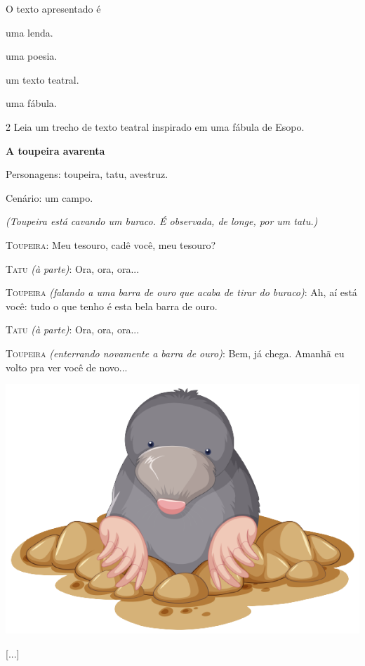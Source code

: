 O texto apresentado é

\begin{escolha}[itemsep=-5pt]
\item uma lenda.

\item uma poesia.

\item um texto teatral.

\item uma fábula.
\end{escolha}


\num{2} Leia um trecho de texto teatral inspirado em uma fábula de Esopo.

\begin{myquote}
\textbf{A toupeira avarenta}

Personagens: toupeira, tatu, avestruz.

Cenário: um campo.

\textit{(Toupeira está cavando um buraco. É observada, de longe, por um tatu.)}

\textsc{Toupeira}: Meu tesouro, cadê você, meu tesouro?

\textsc{Tatu} \textit{(à parte)}: Ora, ora, ora...

\textsc{Toupeira} \textit{(falando a uma barra de ouro que acaba de tirar do
buraco)}: Ah, aí está você: tudo o que tenho é esta bela barra de ouro.

\textsc{Tatu} \textit{(à parte)}: Ora, ora, ora...

\textsc{Toupeira} \textit{(enterrando novamente a barra de ouro)}: Bem, já chega.
Amanhã eu volto pra ver você de novo...

\begin{center}
\noindent\includegraphics[width=.6\textwidth]{./media/image3c.png}
\end{center}

{[}...{]}

\end{myquote}

